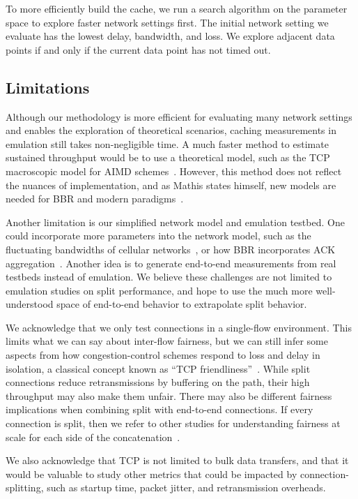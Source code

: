 To more efficiently build the cache, we run a search algorithm on
the parameter space to explore faster network settings first.
The initial network setting we evaluate has the lowest delay, bandwidth, and
loss. We explore adjacent data points if and only if the current data point has
not timed out.

\subsection{Limitations}
\label{sec:splitting:heuristic:limitations}

Although our methodology is more efficient for evaluating many network
settings and enables the exploration of theoretical scenarios,
caching measurements in emulation still takes non-negligible time. A much faster
method to estimate sustained throughput would be to use a theoretical model, such as the
TCP macroscopic model for AIMD schemes~\cite{mathis1997macroscopic}.
However, this method does not reflect the nuances of implementation, and as
Mathis states himself, new models are needed for BBR and modern paradigms~\cite
{mathis2019deprecating,mathis2008reflections}.

Another limitation is our simplified network model and emulation testbed.
One could incorporate more parameters into the network model, such as the
fluctuating bandwidths of cellular networks~\cite{hayes2019mmwave}, or how BBR
incorporates ACK aggregation~\cite{cardwell2018bbr-ietf101}. Another idea is to
generate end-to-end measurements from real testbeds instead of emulation. We
believe these challenges are not limited to emulation studies on split
performance, and hope to use the much more well-understood space of end-to-end
behavior to extrapolate split behavior.

We acknowledge that we only test connections in a single-flow environment.
This limits what we can say about inter-flow fairness, but we can still infer
some aspects from how congestion-control schemes respond to loss and delay in
isolation, a classical concept known as ``TCP friendliness''~\cite{rfc5348}.
While split connections reduce retransmissions by buffering on the path,
their high throughput may also make them unfair. There may also be different
fairness implications when combining split with end-to-end connections.
If every connection is split, then we refer to other studies for understanding
fairness at scale for each side of the concatenation~\cite
{philip2021revisiting}.

We also acknowledge that TCP is not limited to bulk data transfers, and that
it would be valuable to study other metrics that could be impacted by
connection-splitting, such as startup time, packet jitter, and retransmission
overheads.

